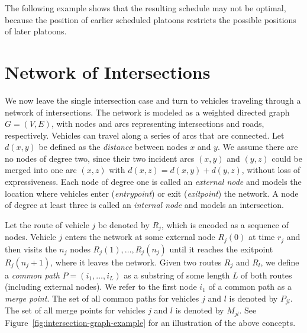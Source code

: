 \documentclass{article}
\newcommand{\inline}[1]{ {\color{blue}{#1}}\addcontentsline{tdo}{todo}{#1}}
\theoremstyle{definition}
\theoremstyle{plain}
\begin{document}
The following example shows that the resulting schedule may not be optimal,
because the position of earlier scheduled platoons restricts the possible
positions of later platoons.
\begin{eg}
  \inline{come up with example}
\end{eg}


\newpage

\section{Network of Intersections}

We now leave the single intersection case and turn to vehicles traveling through
a network of intersections. The network is modeled as a weighted directed graph
$G=(V,E)$, with nodes and arcs representing intersections and roads,
respectively. Vehicles can travel along a series of arcs that are connected. Let
$d(x,y)$ be defined as the \textit{distance} between nodes $x$ and $y$. We
assume there are no nodes of degree two, since their two incident arcs $(x,y)$
and $(y,z)$ could be merged into one arc $(x,z)$ with
$d(x,z) = d(x,y) + d(y,z)$, without loss of expressiveness. Each node of degree
one is called an \textit{external node} and models the location where vehicles
enter (\textit{entrypoint}) or exit (\textit{exitpoint}) the network. A node of
degree at least three is called an \textit{internal node} and models an
intersection.

Let the route of vehicle $j$ be denoted by $R_{j}$, which is encoded as a
sequence of nodes. Vehicle $j$ enters the network at some external node
$R_{j}(0)$ at time $r_{j}$ and then visits the $n_{j}$ nodes
$R_{j}(1), \dots, R_{j}(n_{j})$ until it reaches the exitpoint
$R_{j}(n_{j} + 1)$, where it leaves the network.
Given two routes $R_{j}$ and $R_{l}$, we define a \textit{common path}
$P=(i_{1},\dots,i_{L})$ as a substring of some length $L$ of both routes
(including external nodes). We refer to the first node $i_{1}$ of a common path
as a \textit{merge point}. The set of all common paths for vehicles $j$ and $l$
is denoted by $P_{jl}$. The set of all merge points for vehicles $j$ and $l$ is
denoted by $M_{jl}$. See Figure~\ref{fig:intersection-graph-example} for an
illustration of the above concepts.
\end{document}
